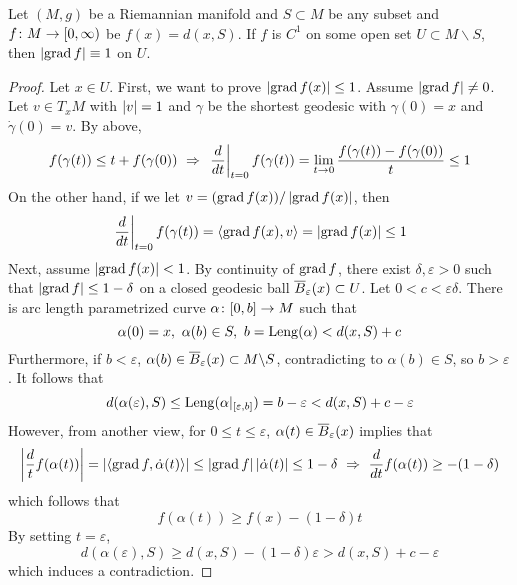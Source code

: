 \begin{enumerate}[label=\arabic{*}.]
	\begin{thm}
	    Let $(M,g)$ be a Riemannian manifold and $S \subset M$ be any subset and $f \colon M \rightarrow [0,\infty)$ be $f(x) = d(x,S)$. If $f$ is $C^1$ on some open set $U \subset M \backslash S$, then $\left\lvert\operatorname{grad} f\right\lvert \equiv 1$ on $U$.
	\end{thm}
	\begin{proof}
	   Let $x \in U$. First, we want to prove $\left\lvert\operatorname{grad} f(x)\right\lvert \leq 1$. Assume $\left\lvert\operatorname{grad} f\right\lvert \neq 0$. Let $v \in T_xM$ with $\left\lvert v\right\lvert = 1$ and $\gamma$ be the shortest geodesic with $\gamma(0) = x$ and $\dot{\gamma}(0) = v$. By above,
	   \begin{equation*}
	       f(\gamma(t)) \leq t + f(\gamma(0))~\Rightarrow~\left.\frac{d}{d t}\right|_{t=0} f(\gamma(t))=\lim _{t\rightarrow 0} \frac{f(\gamma(t))-f(\gamma(0))}{t} \leq 1
	   \end{equation*}
	   On the other hand, if we let $v = (\operatorname{grad}f(x)) / \left\lvert\operatorname{grad}f(x)\right\lvert$, then
	   \begin{equation*}
	       \left.\frac{d}{d t}\right|_{t=0} f(\gamma(t)) = \left\langle \operatorname{grad}f(x),v \right\rangle = \left\lvert\operatorname{grad}f(x)\right\lvert \leq 1
	   \end{equation*}
	   Next, assume $\left\lvert\operatorname{grad}f(x)\right\lvert < 1$. By continuity of $\operatorname{grad}f$, there exist $\delta,\varepsilon > 0$ such that $\left\lvert\operatorname{grad} f\right\lvert \leq 1 -\delta$ on a closed geodesic ball $\overline{B}_\varepsilon(x) \subset U$. Let $0<c<\varepsilon\delta$. There is arc length parametrized curve $\alpha \colon [0,b] \rightarrow M$ such that
	   \begin{equation*}
	       \alpha(0)= x,~\alpha(b) \in S,~b = \operatorname{Leng}(\alpha) < d(x,S) + c
	   \end{equation*}
	   Furthermore, if $b < \varepsilon$, $\alpha(b) \in \overline{B}_\varepsilon(x) \subset M \backslash S$, contradicting to $\alpha(b) \in S$, so $b > \varepsilon$. It follows that
	   \begin{equation*}
	       d(\alpha(\varepsilon),S) \leq \operatorname{Leng}(\alpha|_{[\varepsilon,b]}) = b-\varepsilon < d(x,S) + c -\varepsilon
	   \end{equation*}
	   However, from another view, for $0 \leq t \leq \varepsilon$, $\alpha(t) \in \overline{B}_\varepsilon(x)$ implies that
	   \begin{equation*}
	       \left\lvert\frac{d}{t}f(\alpha(t))\right\lvert = \left\lvert\left\langle \operatorname{grad}f,\dot{\alpha}(t) \right\rangle\right\lvert \leq \left\lvert\operatorname{grad}f\right\lvert\left\lvert\dot{\alpha}(t)\right\lvert \leq 1-\delta ~\Rightarrow~\frac{d}{d t} f(\alpha(t)) \geq -(1-\delta)
	   \end{equation*}
	   which follows that
	   \begin{equation*}
	       f(\alpha(t)) \geq f(x)-(1-\delta) t
	   \end{equation*}
	   By setting $t = \varepsilon$,
	   \begin{equation*}
	       d(\alpha(\varepsilon), S) \geq d(x, S)-(1-\delta) \varepsilon >  d(x,S) + c -\varepsilon
	   \end{equation*}
	   which induces a contradiction.
	\end{proof}


\end{enumerate}
